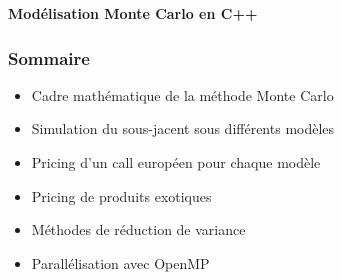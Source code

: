 \documentclass[aspectratio=169,11pt]{beamer}
\begin{document}
\begin{frame}
    \centering
    \vfill

    {\color{titleblue}\Huge
        \textbf{Modélisation Monte Carlo en C++}
    }

    \vfill
\end{frame}

\begin{frame}
    \frametitle{Sommaire}

    \begin{itemize}
        \item Cadre mathématique de la méthode Monte Carlo

        \vspace{0.3cm}

        \item Simulation du sous-jacent sous différents modèles

        \vspace{0.3cm}

        \item Pricing d'un call européen pour chaque modèle

        \vspace{0.3cm}

        \item Pricing de produits exotiques

        \vspace{0.3cm}

        \item Méthodes de réduction de variance

        \vspace{0.3cm}

        \item Parallélisation avec OpenMP
    \end{itemize}

\end{frame}
\end{document}
